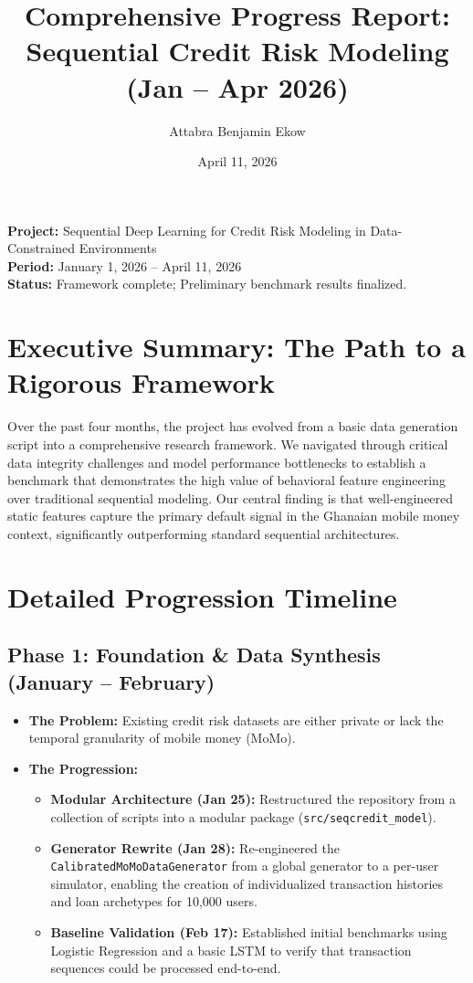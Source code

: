\documentclass[11pt]{article}
\title{Comprehensive Progress Report: \\ Sequential Credit Risk Modeling (Jan -- Apr 2026)}
\author{Attabra Benjamin Ekow}
\date{April 11, 2026}
\begin{document}
\maketitle

\textbf{Project:} Sequential Deep Learning for Credit Risk Modeling in Data-Constrained Environments \\
\textbf{Period:} January 1, 2026 -- April 11, 2026 \\
\textbf{Status:} Framework complete; Preliminary benchmark results finalized.

\hr

\section{Executive Summary: The Path to a Rigorous Framework}
Over the past four months, the project has evolved from a basic data generation script into a comprehensive research framework. We navigated through critical data integrity challenges and model performance bottlenecks to establish a benchmark that demonstrates the high value of behavioral feature engineering over traditional sequential modeling. Our central finding is that well-engineered static features capture the primary default signal in the Ghanaian mobile money context, significantly outperforming standard sequential architectures.

\section{Detailed Progression Timeline}

\subsection{Phase 1: Foundation \& Data Synthesis (January -- February)}
\begin{itemize}[noitemsep]
    \item \textbf{The Problem:} Existing credit risk datasets are either private or lack the temporal granularity of mobile money (MoMo).
    \item \textbf{The Progression:}
    \begin{itemize}
        \item \textbf{Modular Architecture (Jan 25):} Restructured the repository from a collection of scripts into a modular package (\texttt{src/seqcredit\_model}).
        \item \textbf{Generator Rewrite (Jan 28):} Re-engineered the \texttt{CalibratedMoMoDataGenerator} from a global generator to a per-user simulator, enabling the creation of individualized transaction histories and loan archetypes for 10,000 users.
        \item \textbf{Baseline Validation (Feb 17):} Established initial benchmarks using Logistic Regression and a basic LSTM to verify that transaction sequences could be processed end-to-end.
    \end{itemize}
\end{itemize}
\end{document}
